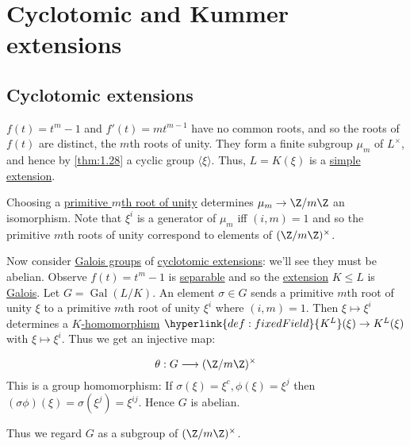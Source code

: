 \documentclass{article}
\DeclareMathOperator{\chara}{char}
\DeclareMathOperator{\Gal}{Gal}
\begin{document}
\clearpage
\section{Cyclotomic and Kummer extensions}
\subsection{Cyclotomic extensions}

\begin{remark}
    $f(t) = t^m - 1$ and $f'(t) = m t^{m-1}$ have no common roots, and so the roots of $f(t)$ are distinct, the $m$th roots of unity.
    They form a finite subgroup $\mu_m$ of $L^\times$, and hence by \cref{thm:1.28} a cyclic group $\langle \xi \rangle$.
    Thus, $L = K(\xi)$ is a \hyperlink{def:genField}{simple extension}.
\end{remark}

Choosing a \hyperlink{def:primRoot}{primitive $m$th root of unity} determines $\mu_m \to \Z /m\Z$ an isomorphism.
Note that $\xi^i$ is a generator of $\mu_m$ iff $(i, m) = 1$ and so the primitive $m$th roots of unity correspond to elements of $(\Z/m\Z)^\times$.

Now consider \hyperlink{def:galoisGroup}{Galois groups} of \hyperlink{def:cycloExt}{cyclotomic extensions}: we'll see they must be abelian.
Observe $f(t) = t^m - 1$ is \hyperlink{def:separablePoly}{separable} and so the \hyperlink{def:fieldExt}{extension} $K \leq L$ is \hyperlink{def:galoisExt}{Galois}.
Let $G = \Gal(L/K)$.
An element $\sigma \in G$ sends a primitive $m$th root of unity $\xi$ to a primitive $m$th root of unity $\xi^i$ where $(i, m) = 1$.
Then $\xi \mapsto \xi^i$ determines a \hyperlink{def:homo}{$K$-homomorphism} $\hyperlink{def:fixedField}{K^L}(\xi) \to K^L(\xi)$ with $\xi \mapsto \xi^i$.
Thus we get an injective map:
\begin{ndef}\label{def:4.3}
    \begin{equation*}
        \theta: G \longrightarrow (\Z/m\Z)^\times
    \end{equation*}
    This is a group homomorphism:
    If $\sigma(\xi) = \xi^c, \phi(\xi) = \xi^j$ then $(\sigma\phi)(\xi) = \sigma(\xi^j) = \xi^{ij}$.
    Hence $G$ is abelian.

    Thus we regard $G$ as a subgroup of $(\Z/m\Z)^\times$.
\end{ndef}
\end{document}
